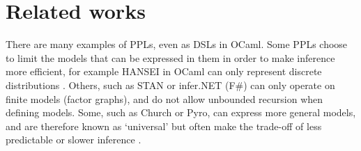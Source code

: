 \section{Related works}
There are many examples of PPLs, even as DSLs in OCaml. Some PPLs choose to limit the models that can be expressed in them in order to make inference more efficient, for example HANSEI in OCaml can only represent discrete distributions \cite{kiselyov2009embedded}. Others, such as STAN or infer.NET (F\#) can only operate on finite models (factor graphs), and do not allow unbounded recursion when defining models. Some, such as Church or Pyro, can express more general models, and are therefore known as `universal' \cite{} but often make the trade-off of less predictable or slower inference \cite{}.

